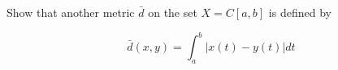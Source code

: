 Show that another metric $\bar{d}$ on the set $X=C[a,b]$ is defined by

$$\bar{d}(x,y)=\int_a^b|x(t)-y(t)|dt$$